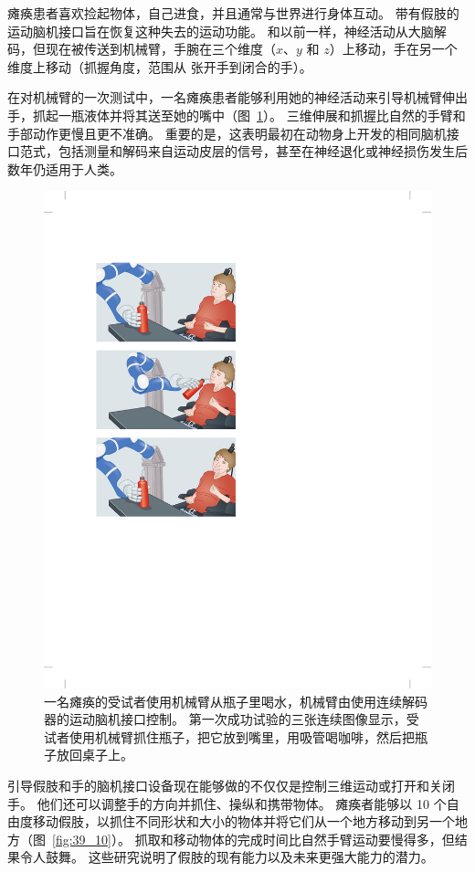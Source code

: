 瘫痪患者喜欢捡起物体，自己进食，并且通常与世界进行身体互动。
带有假肢的运动脑机接口旨在恢复这种失去的运动功能。
和以前一样，神经活动从大脑解码，但现在被传送到机械臂，手腕在三个维度（$ x $、$ y $ 和 $ z $）上移动，手在另一个维度上移动（抓握角度，范围从 张开手到闭合的手）。


在对机械臂的一次测试中，一名瘫痪患者能够利用她的神经活动来引导机械臂伸出手，抓起一瓶液体并将其送至她的嘴中（图~\ref{fig:39_9}）。
三维伸展和抓握比自然的手臂和手部动作更慢且更不准确。
重要的是，这表明最初在动物身上开发的相同脑机接口范式，包括测量和解码来自运动皮层的信号，甚至在神经退化或神经损伤发生后数年仍适用于人类。


\begin{figure}[htbp]
	\centering
	\includegraphics[width=0.35\linewidth]{chap39/fig_39_9}
	\caption{一名瘫痪的受试者使用机械臂从瓶子里喝水，机械臂由使用连续解码器的运动脑机接口控制。 
		第一次成功试验的三张连续图像显示，受试者使用机械臂抓住瓶子，把它放到嘴里，用吸管喝咖啡，然后把瓶子放回桌子上\cite{hochberg2012reach}。}
	\label{fig:39_9}
\end{figure}


引导假肢和手的脑机接口设备现在能够做的不仅仅是控制三维运动或打开和关闭手。
他们还可以调整手的方向并抓住、操纵和携带物体。
瘫痪者能够以 10 个自由度移动假肢，以抓住不同形状和大小的物体并将它们从一个地方移动到另一个地方（图~\ref{fig:39_10}）。
抓取和移动物体的完成时间比自然手臂运动要慢得多，但结果令人鼓舞。
这些研究说明了假肢的现有能力以及未来更强大能力的潜力。


